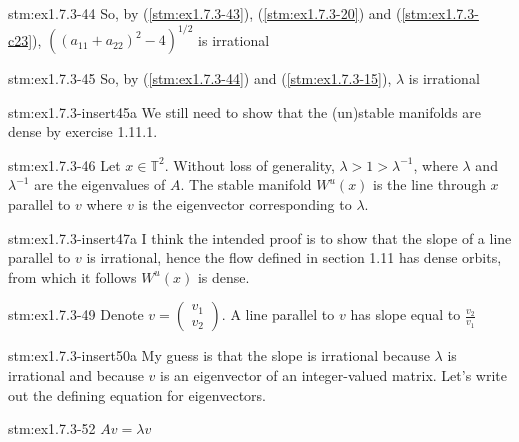 \begin{statement}{stm:ex1.7.3-44}
So, by (\ref{stm:ex1.7.3-43}), (\ref{stm:ex1.7.3-20}) and (\ref{stm:ex1.7.3-c23}), $((a_{11} + a_{22})^2 - 4)^{1/2}$ is irrational
\end{statement}

\begin{statement}{stm:ex1.7.3-45}
So, by (\ref{stm:ex1.7.3-44}) and (\ref{stm:ex1.7.3-15}), $\lambda$ is irrational
\end{statement}

\begin{explanation}{stm:ex1.7.3-insert45a}
We still need to show that the (un)stable manifolds are dense by exercise 1.11.1.
\end{explanation}

\begin{statement}{stm:ex1.7.3-46}
Let $x \in \mathbb{T}^2$. Without loss of generality, $\lambda > 1 > \lambda^{-1}$, where $\lambda$ and $\lambda^{-1}$ are the eigenvalues of $A$. The stable manifold $W^u(x)$ is the line through $x$ parallel to $v$ where $v$ is the eigenvector corresponding to $\lambda$.
\end{statement}

\begin{explanation}{stm:ex1.7.3-insert47a}
I think the intended proof is to show that the slope of a line parallel to $v$ is irrational, hence the flow defined in section 1.11 has dense orbits, from which it follows $W^u(x)$ is dense.
\end{explanation}

\begin{statement}{stm:ex1.7.3-49}
Denote $v = \begin{pmatrix} v_1 \\ v_2 \end{pmatrix}$. A line parallel to $v$ has slope equal to $\frac{v_2}{v_1}$
\end{statement}

\begin{explanation}{stm:ex1.7.3-insert50a}
My guess is that the slope is irrational because $\lambda$ is irrational and because $v$ is an eigenvector of an integer-valued matrix. Let's write out the defining equation for eigenvectors.
\end{explanation}

\begin{statement}{stm:ex1.7.3-52}
$A v = \lambda v$
\end{statement}

